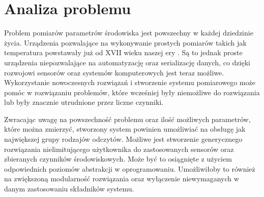 \chapter{Analiza problemu}

Problem pomiarów parametrów środowiska jest powszechny w każdej dziedzinie życia.
Urządzenia pozwalające na wykonywanie prostych pomiarów takich jak temperatura
powstawały już od XVII wieku naszej ery \cite{bigotti:thermomethers}.
Są to jednak proste urządzenia niepozwalające na automatyzację oraz serializację
danych, co dzięki rozwojowi sensorów oraz systemów komputerowych jest teraz
możliwe. Wykorzystanie nowoczesnych rozwiązań i stworzenie systemu pomiarowego
może pomóc w rozwiązaniu problemów, które wcześniej były niemożliwe do rozwiązania
lub były znacznie utrudnione przez liczne czynniki. 


Zwracając uwagę na powszechność problemu oraz ilość możliwych parametrów,
które można zmierzyć, stworzony
system powinien umożliwiać na obsługę jak największej grupy rodzajów
odczytów. Możliwe jest stworzenie generycznego rozwiązania nielimitującego
użytkownika do zastosowanych sensorów oraz zbieranych czynników środowiskowych.
Może być to osiągnięte z użyciem odpowiednich poziomów abstrakcji w oprogramowaniu.
Umożliwiłoby to również na zwiększoną modularność rozwiązania oraz
wyłączenie niewymaganych w danym zastosowaniu składników systemu.
